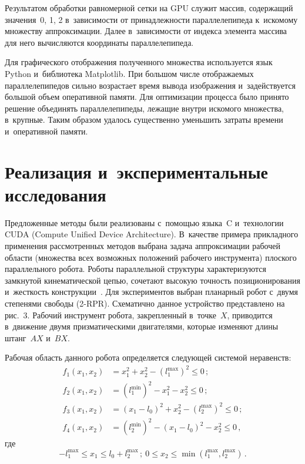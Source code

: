 \begin{multicols}{2}
     
     Результатом обработки равномерной сетки на GPU служит массив, 
содержащий значения~0, 1, 2 в~зависимости от принадлежности 
параллелепипеда к~искомому множеству аппроксимации. Далее в~зависимости 
от индекса элемента массива для него вычисляются координаты 
параллелепипеда.
     
     Для графического отображения полученного множества используется 
язык Python и~библиотека Matplotlib. При большом числе отображаемых 
параллелепипедов сильно возрастает время вывода изображения 
и~задействуется большой объем оперативной памяти. Для оптимизации 
процесса было принято решение объединять параллелепипеды, лежащие 
внутри искомого множества, в~крупные. Таким образом удалось существенно 
уменьшить затраты времени и~оперативной памяти. 

\section{Реализация и~экспериментальные исследования}

     Предложенные методы были реализованы с~помощью языка~C 
и~технологии CUDA (Compute Unified Device Architecture). 
В~качестве примера прикладного применения 
рассмотренных методов выбрана задача аппроксимации рабочей области 
(множества всех возможных положений рабочего инструмента) плоского 
параллельного робота. Роботы параллельной структуры характеризуются 
замкнутой кинематической цепью, сочетают высокую точность 
позиционирования и~жесткость конструкции~\cite{3-pos}. Для экспериментов 
выбран планарный робот с~двумя степенями свободы (\mbox{2-RPR}). Схематично 
данное устройство представлено на рис.~3. Рабочий инструмент робота, 
закрепленный в~точке~$X$, приводится в~движение двумя призматическими 
двигателями, которые изменяют длины штанг~$AX$ и~$BX$.



Рабочая область данного робота определяется следующей системой неравенств:
\begin{align*}
f_1\left( x_1, x_2\right) &=x_1^2+x_2^2-\left( l_1^{\max}\right)^2\leq0\,;\\
f_2\left(x_1, x_2\right)&= \left( l_1^{\min}\right)^2 -x_1^2-x_2^2\leq0\,;\\
f_3\left( x_1, x_2\right)&= \left(x_1-l_0\right)^2 +x_2^2-\left( 
l_2^{\max}\right)^2\leq0\,;\\
f_4\left(x_1, x_2\right)& = \left( l_2^{\min}\right)^2 -\left( x_1-l_0\right)^2-x_2^2\leq 
0\,,
\end{align*}
где
$$
-l_1^{\max}\leq x_1 \leq l_0+l_2^{\max}\,;\
0\leq x_2\leq \min\left( l_1^{\max}, l_2^{\max}\right)\,.
$$


\end{multicols}
